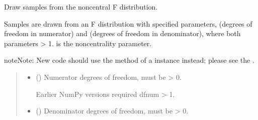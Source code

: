 \documentclass[letterpaper,10pt,english]{sphinxmanual}
\begin{document}

\begin{fulllineitems}
\label{\detokenize{metilda.controllers:metilda.controllers.pitch_art_wizard.noncentral_f}}
\pysigstartsignatures
{}
\pysigstopsignatures
\sphinxAtStartPar
Draw samples from the noncentral F distribution.

\sphinxAtStartPar
Samples are drawn from an F distribution with specified parameters,
 (degrees of freedom in numerator) and  (degrees of
freedom in denominator), where both parameters \textgreater{} 1.
 is the non\sphinxhyphen{}centrality parameter.

\begin{sphinxadmonition}{note}{Note:}
\sphinxAtStartPar
New code should use the
method of a  instance instead;
please see the .
\end{sphinxadmonition}
\begin{quote}\begin{description}
\begin{itemize}
\item {} 
\sphinxAtStartPar
{} () \textendash{} 
\sphinxAtStartPar
Numerator degrees of freedom, must be \textgreater{} 0.

\sphinxAtStartPar
{}Earlier NumPy versions required dfnum \textgreater{} 1.


\item {} 
\sphinxAtStartPar
{} () \textendash{} Denominator degrees of freedom, must be \textgreater{} 0.


\end{itemize}
\end{description}
\end{quote}
\end{fulllineitems}
\end{document}
